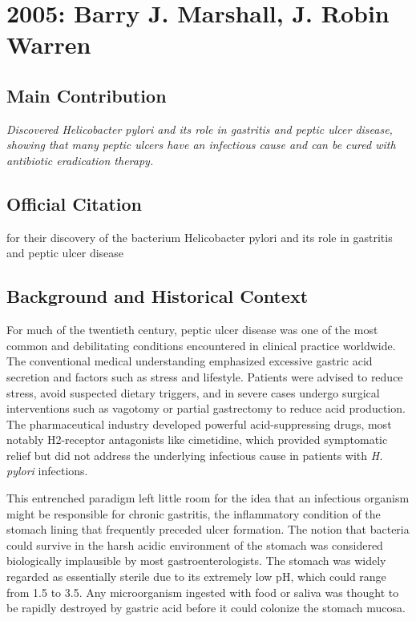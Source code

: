 \chapter[2005 --- Marshall et al.]{2005: Barry J. Marshall, J. Robin Warren}
\label{ch:2005_Marshall}

\section*{Main Contribution}

\textit{Discovered Helicobacter pylori and its role in gastritis and peptic ulcer disease, showing that many peptic ulcers have an infectious cause and can be cured with antibiotic eradication therapy.}\cite{nobel-2005,lecture-2005}

\section{Official Citation}

for their discovery of the bacterium Helicobacter pylori and its role in gastritis and peptic ulcer disease

\section{Background and Historical Context}

For much of the twentieth century, peptic ulcer disease was one of the most common and debilitating conditions encountered in clinical practice worldwide. The conventional medical understanding emphasized excessive gastric acid secretion and factors such as stress and lifestyle. Patients were advised to reduce stress, avoid suspected dietary triggers, and in severe cases undergo surgical interventions such as vagotomy or partial gastrectomy to reduce acid production. The pharmaceutical industry developed powerful acid-suppressing drugs, most notably H2-receptor antagonists like cimetidine, which provided symptomatic relief but did not address the underlying infectious cause in patients with \textit{H. pylori} infections.

This entrenched paradigm left little room for the idea that an infectious organism might be responsible for chronic gastritis, the inflammatory condition of the stomach lining that frequently preceded ulcer formation. The notion that bacteria could survive in the harsh acidic environment of the stomach was considered biologically implausible by most gastroenterologists. The stomach was widely regarded as essentially sterile due to its extremely low pH, which could range from 1.5 to 3.5. Any microorganism ingested with food or saliva was thought to be rapidly destroyed by gastric acid before it could colonize the stomach mucosa.

